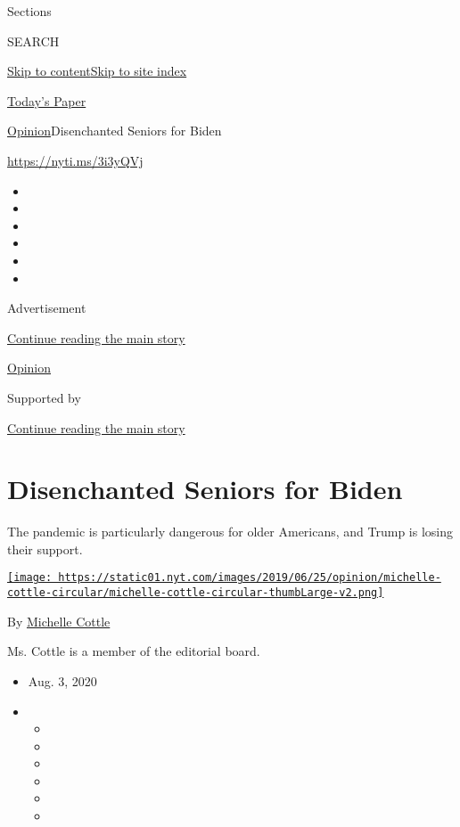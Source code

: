 Sections

SEARCH

\protect\hyperlink{site-content}{Skip to
content}\protect\hyperlink{site-index}{Skip to site index}

\href{https://myaccount.nytimes.com/auth/login?response_type=cookie\&client_id=vi}{}

\href{https://www.nytimes.com/section/todayspaper}{Today's Paper}

\href{/section/opinion}{Opinion}\textbar{}Disenchanted Seniors for Biden

\url{https://nyti.ms/3i3yQVj}

\begin{itemize}
\item
\item
\item
\item
\item
\item
\end{itemize}

Advertisement

\protect\hyperlink{after-top}{Continue reading the main story}

\href{/section/opinion}{Opinion}

Supported by

\protect\hyperlink{after-sponsor}{Continue reading the main story}

\hypertarget{disenchanted-seniors-for-biden}{%
\section{Disenchanted Seniors for
Biden}\label{disenchanted-seniors-for-biden}}

The pandemic is particularly dangerous for older Americans, and Trump is
losing their support.

\href{https://www.nytimes.com/by/michelle-cottle}{\texttt{[image: https://static01.nyt.com/images/2019/06/25/opinion/michelle-cottle-circular/michelle-cottle-circular-thumbLarge-v2.png]}}

By \href{https://www.nytimes.com/by/michelle-cottle}{Michelle Cottle}

Ms. Cottle is a member of the editorial board.

\begin{itemize}
\item
  Aug. 3, 2020
\item
  \begin{itemize}
  \item
  \item
  \item
  \item
  \item
  \item
  \end{itemize}
\end{itemize}


